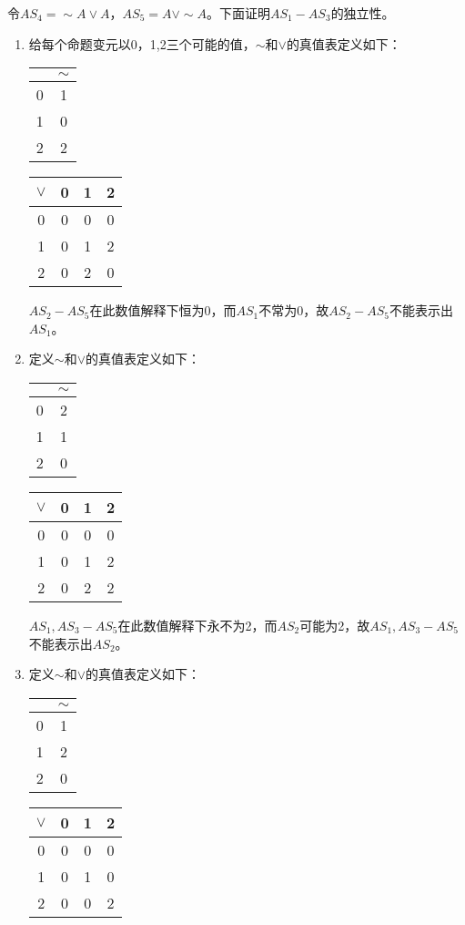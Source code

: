 \documentclass[a4paper]{ctexart}
\begin{document}
令$AS_4=\sim A\vee A$，$AS_5=A\vee\sim A$。下面证明$AS_1-AS_3$的独立性。
\begin{enumerate}
  \item 给每个命题变元以0，1,2三个可能的值，$\sim$和$\vee$的真值表定义如下：
  \begin{table}[!hbp]
    \begin{tabular}{c|c}
      & $\sim$ \\
      \hline
      0 & 1 \\
      1 & 0 \\
      2 & 2
    \end{tabular}
    \hfil
    \begin{tabular}{c|ccc}
      $\vee$ & 0 & 1 & 2 \\
      \hline
      0 & 0 & 0 & 0 \\
      1 & 0 & 1 & 2 \\
      2 & 0 & 2 & 0 \\
    \end{tabular}    
  \end{table}
  
  $AS_2-AS_5$在此数值解释下恒为0，而$AS_1$不常为0，故$AS_2-AS_5$不能表示出$AS_1$。
  \item 定义$\sim$和$\vee$的真值表定义如下：
  \begin{table}[!hbp]
    \begin{tabular}{c|c}
      & $\sim$ \\
      \hline
      0 & 2 \\
      1 & 1 \\
      2 & 0
    \end{tabular}
    \hfil
    \begin{tabular}{c|ccc}
      $\vee$ & 0 & 1 & 2 \\
      \hline
      0 & 0 & 0 & 0 \\
      1 & 0 & 1 & 2 \\
      2 & 0 & 2 & 2 \\
    \end{tabular}    
  \end{table}
  
  $AS_1,AS_3-AS_5$在此数值解释下永不为2，而$AS_2$可能为2，故$AS_1,AS_3-AS_5$不能表示出$AS_2$。
  \item 定义$\sim$和$\vee$的真值表定义如下：
  \begin{table}[!hbp]
    \begin{tabular}{c|c}
      & $\sim$ \\
      \hline
      0 & 1 \\
      1 & 2 \\
      2 & 0
    \end{tabular}
    \hfil
    \begin{tabular}{c|ccc}
      $\vee$ & 0 & 1 & 2 \\
      \hline
      0 & 0 & 0 & 0 \\
      1 & 0 & 1 & 0 \\
      2 & 0 & 0 & 2 \\
    \end{tabular}    
  \end{table}
  

\end{enumerate}
\end{document}
